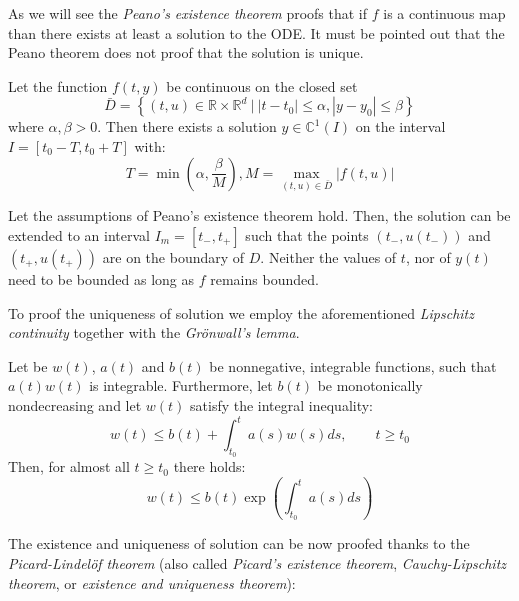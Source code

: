 As we will see the \textit{Peano's existence theorem} proofs that if $f$ is a continuous map than there exists at least a solution to the ODE. It must be pointed out that the Peano theorem does not proof that the solution is unique.

\begin{theorem}
	Let the function $f(t,y)$ be continuous on the closed set
	\begin{equation}
	\bar{D} = \left\lbrace (t,u) \in \mathbb{R} \times \mathbb{R}^d ~\big|~ |t-t_0|\leq\alpha, |y-y_0|\leq\beta \right\rbrace  
	\end{equation}
	where $\alpha,\beta > 0$. Then there exists a solution $y \in \mathbb{C}^1(I)$ on the interval $I = \left[ t_0-T, t_0+T \right]$ with:
	\begin{equation}
		T = \min \left(\alpha, \dfrac{\beta}{M} \right), M = \max_{(t,u)\in\bar{D}}|f(t,u)|
	\end{equation}
\end{theorem}

\begin{theorem}
	Let the assumptions of Peano's existence theorem hold. Then, the solution can be	extended to an interval $I_m = [t_-, t_+]$ such that the points $(t_-,u(t_-))$ and $(t_+, u(t_+))$ are on the boundary of $D$. Neither the values of $t$, nor of $y(t)$ need to be bounded as long as $f$ remains bounded.
\end{theorem}

To proof the uniqueness of solution we employ the aforementioned \textit{Lipschitz continuity} together with the \textit{Gr\"onwall's lemma}.

\begin{lemma}
	Let be $w(t)$, $a(t)$ and $b(t)$ be nonnegative, integrable functions, such that $a(t)w(t)$ is integrable. Furthermore, let $b(t)$ be monotonically nondecreasing and let $w(t)$ satisfy the integral	inequality:
	\begin{equation}
		w(t) \leq b(t) + \int_{t_0}^{t} a(s)w(s)ds, \qquad t \geq t_0
	\end{equation}
	Then, for almost all $t \geq t_0$ there holds:
	\begin{equation}
		w(t) \leq b(t)\exp\left( \int_{t_0}^{t} a(s)ds\right) 
	\end{equation}
\end{lemma}

The existence and uniqueness of solution can be now proofed thanks to the \textit{Picard-Lindel\"of theorem} (also called \textit{Picard's existence theorem}, \textit{Cauchy-Lipschitz theorem}, or \textit{existence and uniqueness theorem}):

